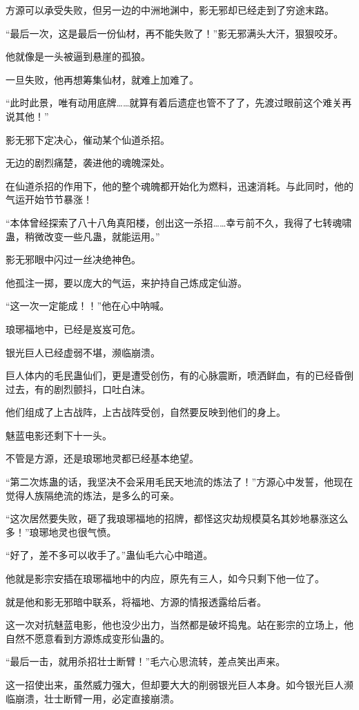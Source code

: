\begin{this_body}
方源可以承受失败，但另一边的中洲地渊中，影无邪却已经走到了穷途末路。

“最后一次，这是最后一份仙材，再不能失败了！”影无邪满头大汗，狠狠咬牙。

他就像是一头被逼到悬崖的孤狼。

一旦失败，他再想筹集仙材，就难上加难了。

“此时此景，唯有动用底牌……就算有着后遗症也管不了了，先渡过眼前这个难关再说其他！”

影无邪下定决心，催动某个仙道杀招。

无边的剧烈痛楚，袭进他的魂魄深处。

在仙道杀招的作用下，他的整个魂魄都开始化为燃料，迅速消耗。与此同时，他的气运开始节节暴涨！

“本体曾经探索了八十八角真阳楼，创出这一杀招……幸亏前不久，我得了七转魂啸蛊，稍微改变一些凡蛊，就能运用。”

影无邪眼中闪过一丝决绝神色。

他孤注一掷，要以庞大的气运，来护持自己炼成定仙游。

“这一次一定能成！！”他在心中呐喊。

琅琊福地中，已经是岌岌可危。

银光巨人已经虚弱不堪，濒临崩溃。

巨人体内的毛民蛊仙们，更是遭受创伤，有的心脉震断，喷洒鲜血，有的已经昏倒过去，有的剧烈颤抖，口吐白沫。

他们组成了上古战阵，上古战阵受创，自然要反映到他们的身上。

魅蓝电影还剩下十一头。

不管是方源，还是琅琊地灵都已经基本绝望。

“第二次炼蛊的话，我坚决不会采用毛民天地流的炼法了！”方源心中发誓，他现在觉得人族隔绝流的炼法，是多么的可亲。

“这次居然要失败，砸了我琅琊福地的招牌，都怪这灾劫规模莫名其妙地暴涨这么多！”琅琊地灵也很气愤。

“好了，差不多可以收手了。”蛊仙毛六心中暗道。

他就是影宗安插在琅琊福地中的内应，原先有三人，如今只剩下他一位了。

就是他和影无邪暗中联系，将福地、方源的情报透露给后者。

这一次对抗魅蓝电影，他也没少出力，当然都是破坏捣鬼。站在影宗的立场上，他自然不愿意看到方源炼成变形仙蛊的。

“最后一击，就用杀招壮士断臂！”毛六心思流转，差点笑出声来。

这一招使出来，虽然威力强大，但却要大大的削弱银光巨人本身。如今银光巨人濒临崩溃，壮士断臂一用，必定直接崩溃。


\end{this_body}
